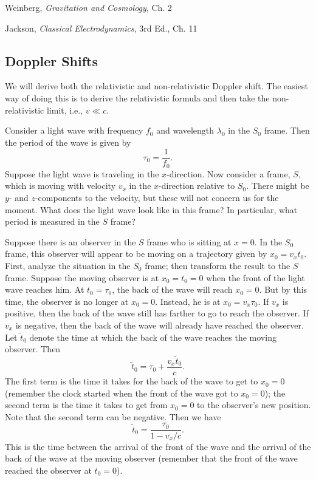 \documentclass{article}
\begin{document}
Weinberg, \emph{Gravitation and Cosmology}, Ch. 2

Jackson, \emph{Classical Electrodynamics}, 3rd Ed., Ch. 11


\subsection{Doppler Shifts}

We will derive both the relativistic and non-relativistic Doppler shift. The easiest way of doing this is to derive the relativistic formula and then take the non-relativistic limit, i.e., $v \ll c$.

Consider a light wave with frequency $f_0$ and wavelength $\lambda_0$ in the $S_0$ frame.  Then the period of the wave is given by
\begin{equation}
\tau_0 = \frac{1}{f_0} .
\end{equation}
Suppose the light wave is traveling in the $x$-direction.  Now consider a frame, $S$, which is moving with velocity $v_x$ in the $x$-direction relative to $S_0$.  There might be $y$- and $z$-components to the velocity, but these will not concern us for the moment. What does the light wave look like in this frame?  In particular, what period is measured in the $S$ frame?  

Suppose there is an observer in the $S$ frame who is sitting at $x = 0$.  In the $S_0$ frame, this observer will appear to be moving on a trajectory given by $x_0 = v_x t_0$.  First, analyze the situation in the $S_0$ frame; then transform the result to the $S$ frame.  Suppose the moving observer is at $x_0 = t_0 = 0$ when the front of the light wave reaches him.  At $t_0 = \tau_0$, the back of the wave will reach $x_0 = 0$.  But by this time, the observer is no longer at $x_0 = 0$.  Instead, he is at $x_0 = v_x \tau_0$.  If $v_x$ is positive, then the back of the wave still has farther to go to reach the observer.  If $v_x$ is negative, then the back of the wave will already have reached the observer.  Let $\tilde{t}_0$ denote the time at which the back of the wave reaches the moving observer.  Then
\begin{equation}
\tilde{t}_0 = \tau_0 + \frac{v_x \tilde{t}_0}{c} .
\end{equation}
The first term is the time it takes for the back of the wave to get to $x_0 = 0$ (remember the clock started when the front of the wave got to $x_0 = 0$); the second term is the time it takes to get from $x_0 = 0$ to the observer's new position.  Note that the second term can be negative.  Then we have
\begin{equation}
\tilde{t}_0 = \frac{\tau_0}{1 - v_x/c} .
\end{equation}
This is the time between the arrival of the front of the wave and the arrival of the back of the wave at the moving observer (remember that the front of the wave reached the observer at $t_0 = 0$).  
\end{document}
